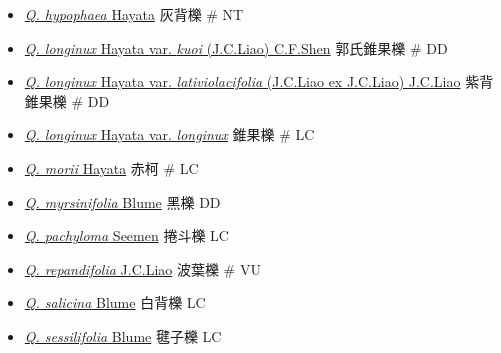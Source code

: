 \begin{itemize}
\begin{itemize}
        \item[] \href{http://www.theplantlist.org/tpl1.1/search?q=Quercus+hypophaea}{\textit{Q. hypophaea} Hayata}   灰背櫟  \# NT
        \item[] \href{http://www.theplantlist.org/tpl1.1/search?q=Quercus+longinux+var.+kuoi}{\textit{Q. longinux} Hayata var. \textit{kuoi} (J.C.Liao) C.F.Shen}   郭氏錐果櫟  \# DD
        \item[] \href{http://www.theplantlist.org/tpl1.1/search?q=Quercus+longinux+var.+lativiolacifolia}{\textit{Q. longinux} Hayata var. \textit{lativiolacifolia} (J.C.Liao ex J.C.Liao) J.C.Liao}   紫背錐果櫟  \# DD
        \item[] \href{http://www.theplantlist.org/tpl1.1/search?q=Quercus+longinux+var.+longinux}{\textit{Q. longinux} Hayata var. \textit{longinux}}   錐果櫟  \# LC
        \item[] \href{http://www.theplantlist.org/tpl1.1/search?q=Quercus+morii}{\textit{Q. morii} Hayata}   赤柯  \# LC
        \item[] \href{http://www.theplantlist.org/tpl1.1/search?q=Quercus+myrsinifolia}{\textit{Q. myrsinifolia} Blume}   黑櫟   DD
        \item[] \href{http://www.theplantlist.org/tpl1.1/search?q=Quercus+pachyloma}{\textit{Q. pachyloma} Seemen}   捲斗櫟   LC
        \item[] \href{http://www.theplantlist.org/tpl1.1/search?q=Quercus+repandifolia}{\textit{Q. repandifolia} J.C.Liao}   波葉櫟  \# VU
        \item[] \href{http://www.theplantlist.org/tpl1.1/search?q=Quercus+salicina}{\textit{Q. salicina} Blume}   白背櫟   LC
        \item[] \href{http://www.theplantlist.org/tpl1.1/search?q=Quercus+sessilifolia}{\textit{Q. sessilifolia} Blume}   毽子櫟   LC

\end{itemize}
\end{itemize}
